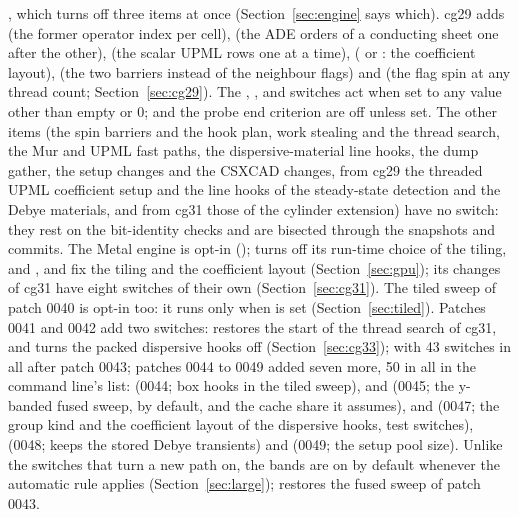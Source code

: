\begin{itemize}
  , which turns off three items at once (Section~\ref{sec:engine} says which). cg29
  adds  (the former operator index per cell),  (the
  ADE orders of a conducting sheet one after the other),  (the scalar UPML rows one at a
  time),  ( or : the coefficient layout),  (the
  two barriers instead of the neighbour flags) and  (the flag spin at any thread
  count; Section~\ref{sec:cg29}). The , ,
   and  switches act when set to any value other than empty or
  0;  and the probe end criterion are off unless set. The other items (the spin barriers and the
  hook plan, work stealing and the thread search, the Mur and UPML fast paths, the dispersive-material line hooks, the
  dump gather, the setup changes and the CSXCAD changes, from cg29 the threaded UPML coefficient setup and the
  line hooks of the steady-state detection and the Debye materials, and from cg31 those of the cylinder extension)
  have no switch: they rest on the bit-identity
  checks and are bisected through the snapshots and commits. The Metal engine is opt-in
  ();  turns off its run-time choice of the tiling, and
  ,  and  fix the tiling and the
  coefficient layout (Section~\ref{sec:gpu}); its changes of cg31 have eight switches of their own
  (Section~\ref{sec:cg31}). The tiled sweep of patch 0040 is opt-in too: it runs only when 
  is set (Section~\ref{sec:tiled}). Patches 0041 and 0042 add two switches:  restores the start of
  the thread search of cg31, and  turns the packed dispersive hooks off (Section~\ref{sec:cg33});
  with 43 switches in all after patch 0043; patches 0044 to 0049 added seven more, 50 in all in the command line's list:  (0044; box hooks in the tiled sweep),  and  (0045; the y-banded fused sweep,  by default, and the cache share it assumes),  and  (0047; the group kind and the coefficient layout of the dispersive hooks, test switches),  (0048;  keeps the stored Debye transients) and  (0049; the setup pool size). Unlike the switches that turn a new path on, the bands are on by default whenever the automatic rule applies (Section~\ref{sec:large});  restores the fused sweep of patch 0043.

\end{itemize}
